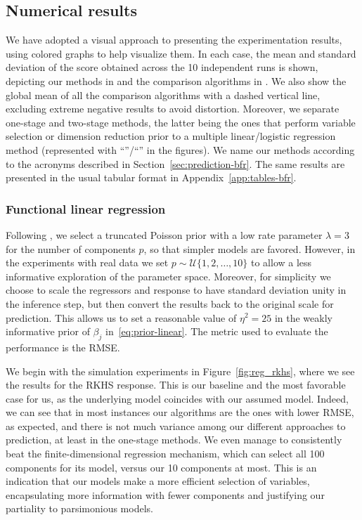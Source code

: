\subsection{Numerical results}

We have adopted a visual approach to presenting the experimentation results, using colored graphs to help visualize them. In each case, the mean and standard deviation of the score obtained across the 10 independent runs is shown, depicting our methods in  and the comparison algorithms in . We also show the global mean of all the comparison algorithms with a dashed vertical line, excluding extreme negative results to avoid distortion. Moreover, we separate one-stage and two-stage methods, the latter being the ones that perform variable selection or dimension reduction prior to a multiple linear/logistic regression method (represented with ``''/``'' in the figures). We name our methods according to the acronyms described in Section~\ref{sec:prediction-bfr}. The same results are presented in the usual tabular format in Appendix~\ref{app:tables-bfr}.

\subsubsection*{Functional linear regression}

Following \citet{nobile2007bayesian}, we select a truncated Poisson prior with a low rate parameter \(\lambda=3\) for the number of components \(p\), so that simpler models are favored. However, in the experiments with real data we set \(p\sim \mathcal U\{1,2,\dots,10\}\) to allow a less informative exploration of the parameter space. Moreover, for simplicity we choose to scale the regressors and response to have standard deviation unity in the inference step, but then convert the results back to the original scale for prediction. This allows us to set a reasonable value of \(\eta^2=25\) in the weakly informative prior of \(\beta_j\) in~\eqref{eq:prior-linear}. The metric used to evaluate the performance is the \acf{RMSE}.

We begin with the simulation experiments in Figure~\ref{fig:reg_rkhs}, where we see the results for the \acs{RKHS} response. This is our baseline and the most favorable case for us, as the underlying model coincides with our assumed model. Indeed, we can see that in most instances our algorithms are the ones with lower \acs{RMSE}, as expected, and there is not much variance among our different approaches to prediction, at least in the one-stage methods. We even manage to consistently beat the  finite-dimensional regression mechanism, which can select all 100 components for its model, versus our 10 components at most. This is an indication that our models make a more efficient selection of variables, encapsulating more information with fewer components and justifying our partiality to parsimonious models.

